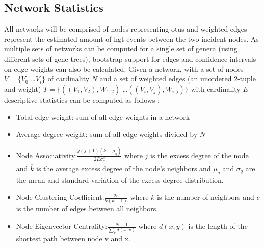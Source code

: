 \subsection*{Network Statistics}
All networks will be comprised of nodes representing \ac{otu}s and weighted edges represent the estimated amount of \ac{hgt} events between the two incident nodes.
As multiple sets of networks can be computed for a single set of genera (using different sets of gene trees), bootstrap support for edges and confidence intervals on edge weights can also be calculated.
Given a network, with a set of nodes $V = \{V_0$ \dots $V_i\}$ of cardinality $N$ and a set of weighted edges (an unordered 2-tuple and weight) $T = \{((V_1,V_2),W_{1,2})$ \dots $((V_i,V_j),W_{i,j})\}$ with cardinality $E$ descriptive statistics can be computed as follows \citep{netstat}:
\begin{itemize}
    \item Total edge weight: sum of all edge weights in a network
    \item Average degree weight: sum of all edge weights divided by $N$
    \item Node Associativity:$ \frac{j(j+1)(\overline{k}-\mu_q)}{2E\sigma^2_q}$ where $j$ is the excess degree of the node and $\overline{k}$ is the average excess degree of the node's neighbors and $\mu_q$ and $\sigma_q$ are the mean and standard variation of the excess degree distribution.
    \item Node Clustering Coefficient:$ \frac{2e}{k(k-1)}$ where $k$ is the number of neighbors and $e$ is the number of edges between all neighbors.
    \item Node Eigenvector Centrality:$ \frac{N-1}{\sum_v d(x,v)}$ where $d(x,y)$ is the length of the shortest path between node v and x.
\end{itemize}
